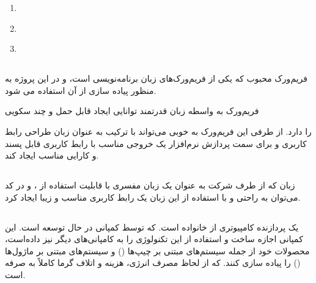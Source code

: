 \documentclass[a4paper,12pt]{report}
\begin{document}
	\begin{enumerate}[nosep]\label{item1:sec5:chap1}
		\item
			\hyperref[subsec1:sec5:chap1]{}
		\item
			\hyperref[subsec2:sec5:chap1]{}
		\item
			\hyperref[subsec3:sec5:chap1]{}
	\end{enumerate}

	\subsection{}\label{subsec1:sec5:chap1}
		فریم‌ورک
		محبوب
		که یکی از فریم‌ورک‌های زبان برنامه‌نویسی
		است، و در این پروژه به منظور پیاده سازی
		از آن استفاده می شود.

		فریم‌ورک
		به واسطه زبان قدرتمند
		توانایی ایجاد
		قابل حمل و چند سکویی

		را دارد.
		از طرفی این فریم‌ورک به خوبی می‌تواند با ترکیب
		به عنوان زبان طراحی رابط کاربری و
		برای سمت پردازش نرم‌افزار یک خروجی مناسب با رابط کاربری قابل پسند و کارایی مناسب ایجاد کند.
	\subsection{}\label{subsec2:sec5:chap1}
	زبان
	که از طرف شرکت
	به عنوان یک زبان مفسری با قابلیت استفاده از
	،
	و
	در کد می‌توان به راحتی و با استفاده از این زبان یک رابط کاربری مناسب و زیبا ایجاد کرد.
	\cite{QtQML51548:online}
	\subsection{}\label{subsec3:sec5:chap1}
	یک پردازنده کامپیوتری از خانواده
	است. که توسط کمپانی
	در حال توسعه است.
	این کمپانی اجازه ساخت و استفاده از این تکنولوژی را به کامپانی‌های دیگر نیز داده‌است،‌ محصولات خود از جمله سیستم‌های مبتنی بر چیپ‌ها
	()
	و سیستم‌های مبتنی بر ماژول‌ها
	()
	را پیاده سازی کنند. که از لحاظ مصرف انرژی، هزینه و اتلاف گرما کاملاً به صرفه است.
\end{document}
